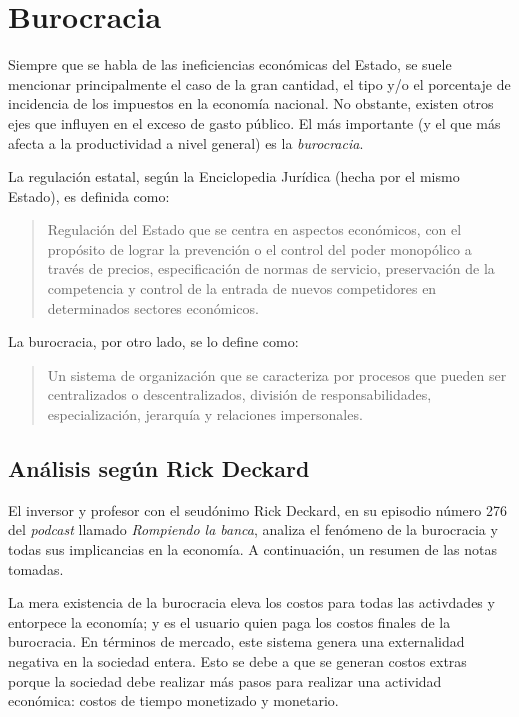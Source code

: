 \documentclass[12pt,a4paper,twoside]{book}
\begin{document}
\section{Burocracia}
Siempre que se habla de las ineficiencias económicas del Estado, se suele mencionar principalmente el caso de la gran cantidad, el tipo y/o el porcentaje de incidencia de los impuestos en la economía nacional. No obstante, existen otros ejes que influyen en el exceso de gasto público. El más importante (y el que más afecta a la productividad a nivel general) es la \textit{burocracia}.

La regulación estatal, según la Enciclopedia Jurídica (hecha por el mismo Estado), es definida como:

\begin{quotation}
Regulación del Estado que se centra en aspectos económicos, con el propósito de lograr la prevención o el control del poder monopólico a través de precios, especificación de normas de servicio, preservación de la competencia y control de la entrada de nuevos competidores en determinados sectores económicos. \cite{def:regulacion}
\end{quotation}

La burocracia, por otro lado, se lo define como:

\begin{quotation}
Un sistema de organización que se caracteriza por procesos que pueden ser centralizados o descentralizados, división de responsabilidades, especialización, jerarquía y relaciones impersonales. \cite{epedia:burocracia}
\end{quotation}

\subsection{Análisis según Rick Deckard}
El inversor y profesor con el seudónimo Rick Deckard, en su episodio número 276 del \textit{podcast} llamado \textit{Rompiendo la banca}, analiza el fenómeno de la burocracia y todas sus implicancias en la economía. A continuación, un resumen de las notas tomadas.

La mera existencia de la burocracia eleva los costos para todas las activdades y entorpece la economía; y es el usuario quien paga los costos finales de la burocracia. En términos de mercado, este sistema genera una externalidad negativa en la sociedad entera. Esto se debe a que se generan costos extras porque la sociedad debe realizar más pasos para realizar una actividad económica: costos de tiempo monetizado y monetario.
\end{document}
